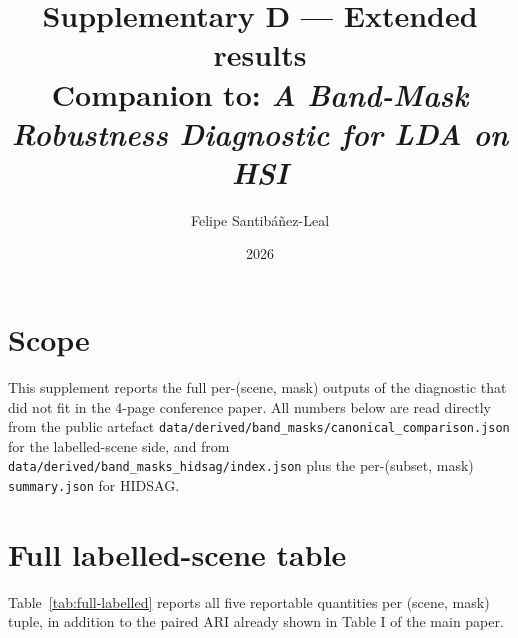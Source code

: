 \documentclass[11pt,a4paper]{article}
\title{Supplementary D --- Extended results\\
{\large Companion to: \emph{A Band-Mask Robustness Diagnostic for LDA on HSI}}}
\author{Felipe Santib\'a\~nez-Leal}
\date{2026}
\begin{document}
\maketitle

\section{Scope}
This supplement reports the full per-(scene, mask) outputs of the
diagnostic that did not fit in the 4-page conference paper. All
numbers below are read directly from the public artefact
\texttt{data/derived/band\_masks/canonical\_comparison.json} for the
labelled-scene side, and from \texttt{data/derived/band\_masks\_hidsag/index.json}
plus the per-(subset, mask) \texttt{summary.json} for HIDSAG.

\section{Full labelled-scene table}

Table~\ref{tab:full-labelled} reports all five reportable quantities
per (scene, mask) tuple, in addition to the paired ARI already shown
in Table I of the main paper.
\end{document}

